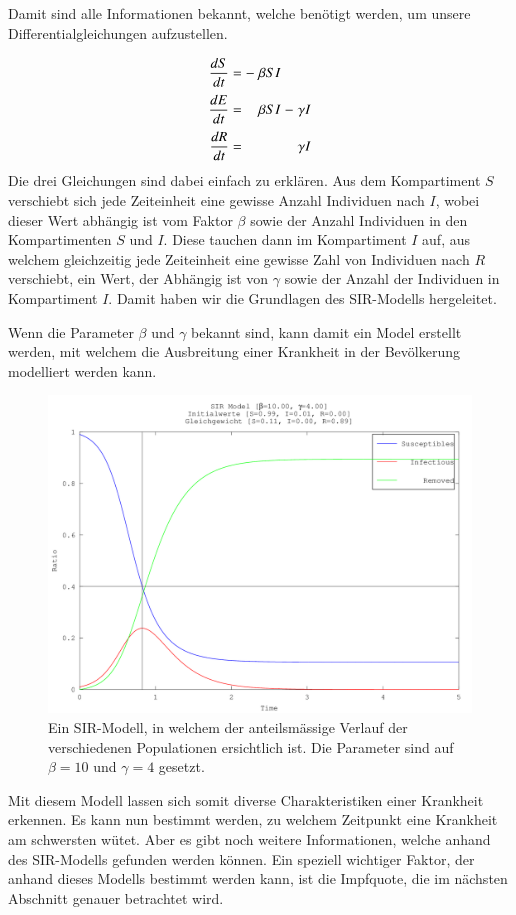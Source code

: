 \begin{refsection}
Damit sind alle Informationen bekannt, welche benötigt werden, um unsere Differentialgleichungen aufzustellen. 
\[
\arraycolsep=1.4pt\def\arraystretch{2.2}
  \begin{array}{rccrcrcr}
   \displaystyle\frac{dS}{dt} & = &-&\beta S I& &        \\
   \displaystyle\frac{dE}{dt} & = & &\beta S I&-&\gamma I\\
   \displaystyle\frac{dR}{dt} & = & &         & &\gamma I
 \end{array}
\]
Die drei Gleichungen sind dabei einfach zu erklären. 
Aus dem Kompartiment $S$ verschiebt sich jede Zeiteinheit eine gewisse Anzahl Individuen nach $I$, wobei dieser Wert abhängig ist vom Faktor $\beta$ sowie der Anzahl Individuen in den Kompartimenten $S$ und $I$.
Diese tauchen dann im Kompartiment $I$ auf, aus welchem gleichzeitig jede Zeiteinheit eine gewisse Zahl von Individuen nach $R$ verschiebt, ein Wert, der Abhängig ist von $\gamma$ sowie der Anzahl der Individuen in Kompartiment $I$. 
Damit haben wir die Grundlagen des SIR-Modells hergeleitet. 

Wenn die Parameter $\beta$ und $\gamma$ bekannt sind, kann damit ein Model erstellt werden, mit welchem die Ausbreitung einer Krankheit in der Bevölkerung modelliert werden kann.

\begin{figure}[h]
  \centering
  \includegraphics[width=.8\textwidth]{sir/images/SIR}
  \caption[Nullkline]{Ein SIR-Modell, in welchem der anteilsmässige Verlauf der verschiedenen Populationen ersichtlich ist. Die Parameter sind auf $\beta=10$ und $\gamma = 4$ gesetzt. }
  \label{fig:quiver}
\end{figure}

Mit diesem Modell lassen sich somit diverse Charakteristiken einer Krankheit erkennen. 
Es kann nun bestimmt werden, zu welchem Zeitpunkt eine Krankheit am schwersten wütet. 
Aber es gibt noch weitere Informationen, welche anhand des SIR-Modells gefunden werden können.
Ein speziell wichtiger Faktor, der anhand dieses Modells bestimmt werden kann, ist die Impfquote, die im nächsten Abschnitt genauer betrachtet wird.


\end{refsection}
